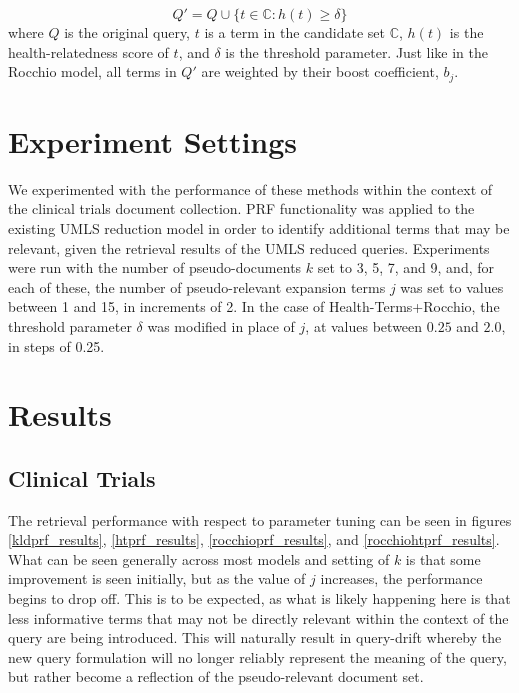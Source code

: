 \documentclass[a4paper]{report}
\begin{document}
$$Q' = Q \cup \{ t \in \mathbb{C} : h(t) \geq \delta\}$$
where $Q$ is the original query, $t$ is a term in the candidate set $\mathbb{C}$, $h(t)$ is the health-relatedness score of $t$, and $\delta$ is the threshold parameter. Just like in the Rocchio model, all terms in $Q'$ are weighted by their boost coefficient, $b_j$.

\section{Experiment Settings}
We experimented with the performance of these methods within the context of the clinical trials document collection. PRF functionality was applied to the existing UMLS reduction model in order to identify additional terms that may be relevant, given the retrieval results of the UMLS reduced queries. Experiments were run with the number of pseudo-documents $k$ set to 3, 5, 7, and 9, and, for each of these, the number of pseudo-relevant expansion terms $j$ was set to values between 1 and 15, in increments of 2. In the case of Health-Terms+Rocchio, the threshold parameter $\delta$ was modified in place of $j$, at values between $0.25$ and $2.0$, in steps of 0.25.

\section{Results}

\subsection{Clinical Trials}
The retrieval performance with respect to parameter tuning can be seen in figures \ref{kldprf_results}, \ref{htprf_results}, \ref{rocchioprf_results}, and \ref{rocchiohtprf_results}. What can be seen generally across most models and setting of $k$ is that some improvement is seen initially, but as the value of $j$ increases, the performance begins to drop off. This is to be expected, as what is likely happening here is that less informative terms that may not be directly relevant within the context of the query are being introduced. This will naturally result in query-drift whereby the new query formulation will no longer reliably represent the meaning of the query, but rather become a reflection of the pseudo-relevant document set. 
\end{document}
